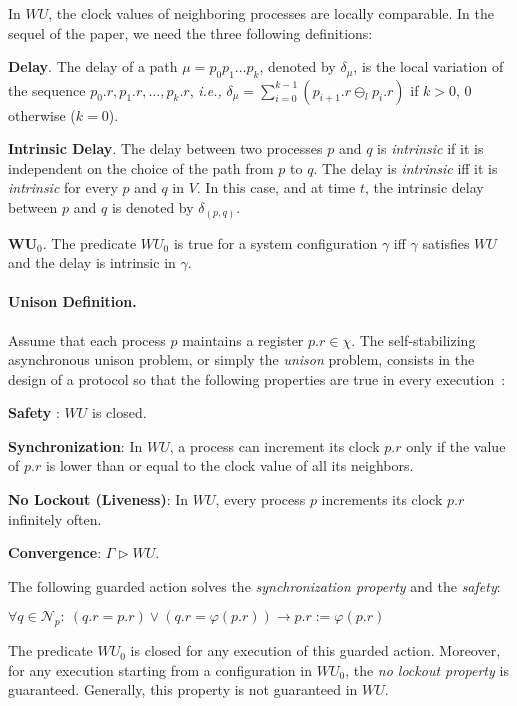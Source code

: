 \documentclass[11pt]{article}
\newcommand{\BEGLIST}{\begin{list}{}{\partopsep -2pt \parsep -2pt \listparindent 0pt}}\newcommand{\ENDLIST}{\end{list}}
\newcommand{\mN}   {\mathcal{N}}
\newcommand{\ie}{\emph{i.e., }}
\begin{document}
In $WU$, the clock values of neighboring processes are locally comparable.  In the sequel of the paper,
we need the three following definitions:
\BEGLIST
\item [\textbf{Delay}.]  \label{def:delay} The delay of a path $\mu = p_0p_1\ldots p_k$, denoted by
$\delta _\mu$, is the local variation of the sequence 
$p_0.r, p_1.r,\ldots, p_k.r$, \ie $\delta _\mu = \sum \limits_{i=0}^{k-1}\left( p_{i+1}.r \ominus _l p_i.r\right)$ if 
$k > 0$, $0$ otherwise ($k=0$).
\item  [\textbf{Intrinsic Delay}.] \label{def:intrinsic}
The delay between two processes $p$ and $q$ is \emph{intrinsic} if it is independent on the choice
of the path from $p$ to $q$.  The delay is \emph{intrinsic} iff it is \emph{intrinsic} for every 
$p$ and $q$ in $V$. In this case, and at time $t$, the intrinsic delay between $p$ and $q$ is denoted by $\delta_{(p,q)}$.
\item [\textbf{WU$_0$}.] The predicate $ WU_0$ is true for a system configuration $\gamma$ iff $\gamma$ satisfies $WU$ 
and the delay is intrinsic in $\gamma$.  
\ENDLIST



\paragraph{Unison Definition.}

Assume that each process $p$ maintains a register $p.r \in \chi$. 
The self-stabilizing asynchronous unison problem, or simply the \emph{unison} problem, consists in the 
design of a protocol so that the following properties are true in every execution~\cite{BPV05}:  
\begin{list}{}{\partopsep -2pt \parsep -2pt \listparindent .3in  .3in}
\item[\textbf{Safety }: ] $WU$ is closed.
\item[\textbf{Synchronization}: ] 
In $WU$, a process can increment its clock $p.r$ only if the value of $p.r$ is lower than or equal to
the clock value of all its neighbors. 
\item[\textbf{No Lockout (Liveness)}: ]
In $WU$, every process $p$ increments its clock $p.r$ infinitely often. 
 \item[\textbf{Convergence}: ] 
$\Gamma \triangleright WU$. 
\end{list}

The following guarded action solves the \emph{synchronization property} and the \emph{safety}:
\begin{center}
$
\forall q \in \mN_p:\ (q.r=p.r)\vee (q.r =\varphi (p.r))\longrightarrow p.r := \varphi(p.r)
$\end{center}
The predicate $WU_0$ is closed for any execution of this guarded action.  Moreover,
for any execution starting from a configuration in $WU_0$, the \emph{no lockout property} is
guaranteed. Generally, this property is not guaranteed in $WU$.
\end{document}
